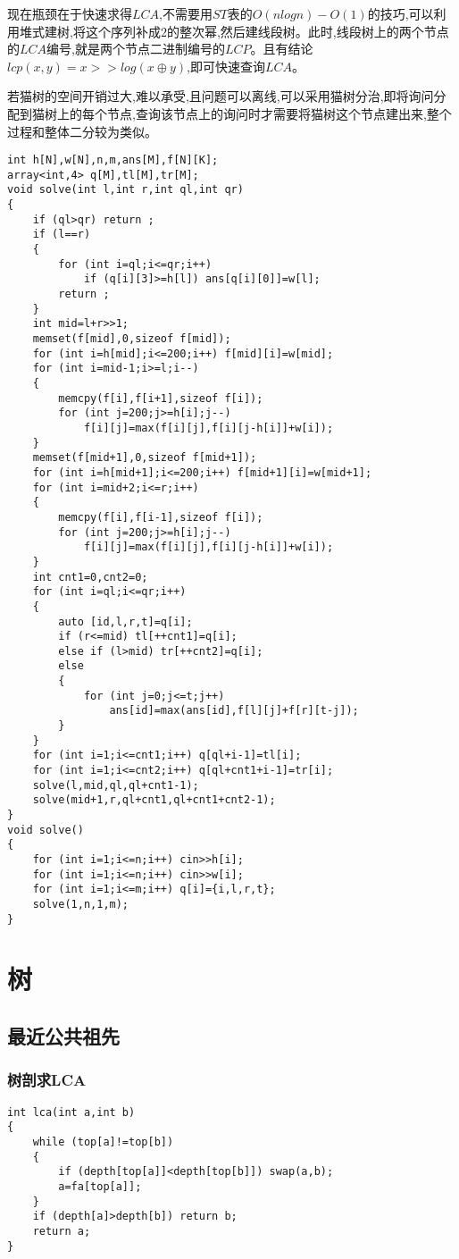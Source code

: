 \documentclass[a4paper]{ctexart}
\begin{document}
现在瓶颈在于快速求得$LCA$,不需要用$ST$表的$O(nlogn)-O(1)$的技巧,可以利用堆式建树,将这个序列补成$2$的整次幂,然后建线段树。此时,线段树上的两个节点的$LCA$编号,就是两个节点二进制编号的$LCP$。且有结论$lcp(x,y)=x>>log(x\oplus y)$,即可快速查询$LCA$。

若猫树的空间开销过大,难以承受,且问题可以离线,可以采用猫树分治,即将询问分配到猫树上的每个节点,查询该节点上的询问时才需要将猫树这个节点建出来,整个过程和整体二分较为类似。
\begin{lstlisting}
int h[N],w[N],n,m,ans[M],f[N][K];
array<int,4> q[M],tl[M],tr[M];
void solve(int l,int r,int ql,int qr)
{
    if (ql>qr) return ;
    if (l==r)
    {
        for (int i=ql;i<=qr;i++)
            if (q[i][3]>=h[l]) ans[q[i][0]]=w[l];
        return ;
    }
    int mid=l+r>>1;
    memset(f[mid],0,sizeof f[mid]);
    for (int i=h[mid];i<=200;i++) f[mid][i]=w[mid];
    for (int i=mid-1;i>=l;i--)
    {
        memcpy(f[i],f[i+1],sizeof f[i]);
        for (int j=200;j>=h[i];j--)
            f[i][j]=max(f[i][j],f[i][j-h[i]]+w[i]);
    }
    memset(f[mid+1],0,sizeof f[mid+1]);
    for (int i=h[mid+1];i<=200;i++) f[mid+1][i]=w[mid+1];
    for (int i=mid+2;i<=r;i++)
    {
        memcpy(f[i],f[i-1],sizeof f[i]);
        for (int j=200;j>=h[i];j--)
            f[i][j]=max(f[i][j],f[i][j-h[i]]+w[i]);
    }
    int cnt1=0,cnt2=0;
    for (int i=ql;i<=qr;i++)
    {
        auto [id,l,r,t]=q[i];
        if (r<=mid) tl[++cnt1]=q[i];
        else if (l>mid) tr[++cnt2]=q[i];
        else
        {
            for (int j=0;j<=t;j++)
                ans[id]=max(ans[id],f[l][j]+f[r][t-j]);
        }
    }
    for (int i=1;i<=cnt1;i++) q[ql+i-1]=tl[i];
    for (int i=1;i<=cnt2;i++) q[ql+cnt1+i-1]=tr[i];
    solve(l,mid,ql,ql+cnt1-1);
    solve(mid+1,r,ql+cnt1,ql+cnt1+cnt2-1);
}
void solve()
{
    for (int i=1;i<=n;i++) cin>>h[i];
    for (int i=1;i<=n;i++) cin>>w[i];
    for (int i=1;i<=m;i++) q[i]={i,l,r,t};
    solve(1,n,1,m);
}
\end{lstlisting}

\section{树}

\subsection{最近公共祖先}
\subsubsection{树剖求LCA}
\begin{lstlisting}
int lca(int a,int b)
{
	while (top[a]!=top[b])
	{
		if (depth[top[a]]<depth[top[b]]) swap(a,b);
		a=fa[top[a]];
	}
	if (depth[a]>depth[b]) return b;
	return a;
}
\end{lstlisting}
\end{document}
